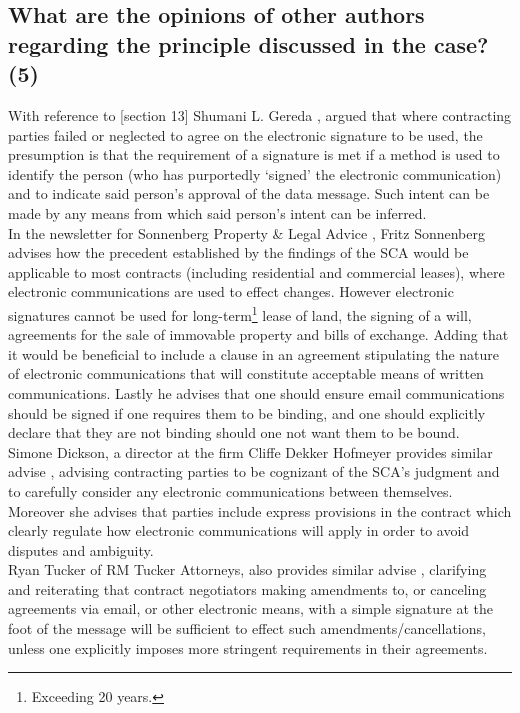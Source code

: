\documentclass[11pt]{article}
\begin{document}
\subsection{What are the opinions of other authors regarding the principle discussed in the case? (5)}
\label{sec:orgb0c03e5}

With reference to [section 13]\cite{rsa02_elect_comm_trans_act} Shumani L. Gereda
\cite{gereda16_elec_comms_trans_act}, argued that where contracting parties failed
or neglected to agree on the electronic signature to be used, the presumption is
that the requirement of a signature is met if a method is used to identify the
person (who has purportedly `signed' the electronic communication) and to
indicate said person's approval of the data message. Such intent can be made by
any means from which said person's intent can be inferred.\\

In the newsletter for Sonnenberg Property \& Legal Advice \cite{fritz_sonnenberg},
Fritz Sonnenberg advises how the precedent established by the  findings of the
SCA would be applicable to most contracts (including residential and commercial
leases), where electronic communications are used to effect changes. However
electronic signatures cannot be used for long-term\footnote{Exceeding 20 years.}
lease of land, the signing of a will, agreements for the sale of immovable
property and bills of exchange. Adding that it would be beneficial to include a
clause in an agreement stipulating the nature of electronic communications that
will constitute acceptable means of written communications. Lastly he advises
that one should ensure email communications should be signed if one requires
them to be binding, and one should explicitly declare that they are not binding
should one not want them to be bound.\\

Simone Dickson, a director at the firm Cliffe Dekker Hofmeyer provides similar
advise \cite{simone_dickson}, advising contracting parties to be cognizant of the
SCA's judgment and to carefully consider any electronic communications between
themselves. Moreover she advises that parties include express provisions in the
contract which clearly regulate how electronic communications will apply in
order to avoid disputes and ambiguity.\\

Ryan Tucker of RM Tucker Attorneys, also provides similar advise \cite{rmtucker},
clarifying and reiterating that contract negotiators making amendments to, or
canceling agreements via email, or other electronic means, with a simple
signature at the foot of the message will be sufficient to effect such
amendments/cancellations, unless one explicitly imposes more stringent
requirements in their agreements.\\
\end{document}
